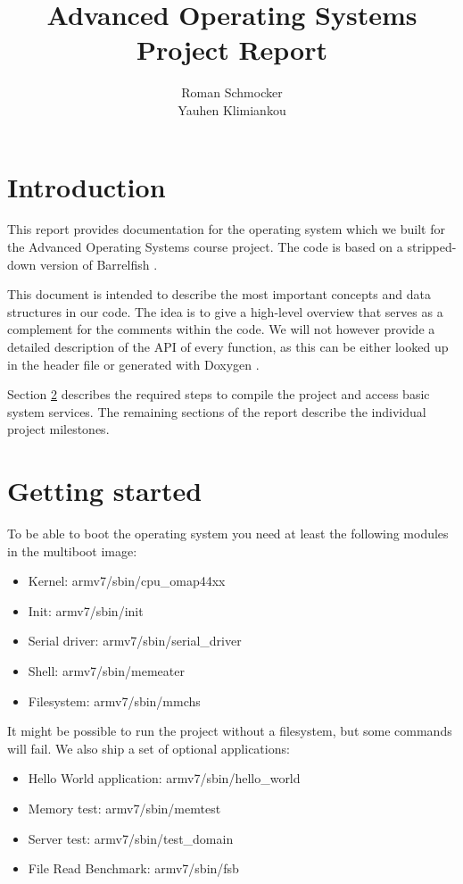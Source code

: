 \documentclass[a4paper,10pt]{article}
\title{Advanced Operating Systems \\ Project Report}
\author{Roman Schmocker \\ Yauhen Klimiankou}
\begin{document}
\maketitle


\section{Introduction}

This report provides documentation for the operating system which we built for the Advanced Operating Systems course project.
The code is based on a stripped-down version of Barrelfish \cite {web:barrelfish}.

This document is intended to describe the most important concepts and data structures in our code.
The idea is to give a high-level overview that serves as a complement for the comments within the code.
We will not however provide a detailed description of the API of every function, as this can be either looked up in the header file or generated with Doxygen \cite{web:doxygen}.

Section \ref{sec:getting-started} describes the required steps to compile the project and access basic system services.
The remaining sections of the report describe the individual project milestones.

\section{Getting started}
\label{sec:getting-started}

To be able to boot the operating system you need at least the following modules in the multiboot image:
\begin{itemize}
 \item Kernel: armv7/sbin/cpu\_omap44xx
 \item Init: armv7/sbin/init
 \item Serial driver: armv7/sbin/serial\_driver
 \item Shell: armv7/sbin/memeater
 \item Filesystem: armv7/sbin/mmchs
\end{itemize}

It might be possible to run the project without a filesystem, but some commands will fail.
We also ship a set of optional applications:
\begin{itemize}
 \item Hello World application: armv7/sbin/hello\_world
 \item Memory test: armv7/sbin/memtest
 \item Server test: armv7/sbin/test\_domain
 \item File Read Benchmark: armv7/sbin/fsb
\end{itemize}
\end{document}
